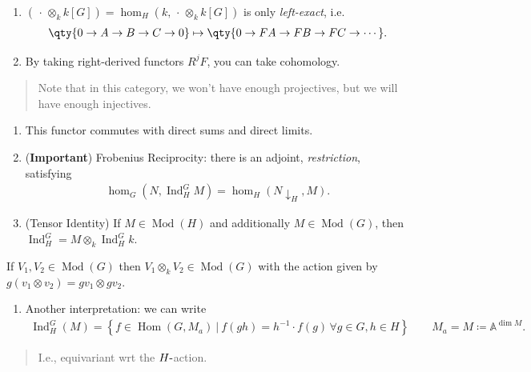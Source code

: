 \begin{enumerate}
\def\labelenumi{\arabic{enumi}.}
\item
  \(({\,\cdot\,}\otimes_k k[G]) = \hom_H(k, {\,\cdot\,}\otimes_k k[G])\)
  is only \emph{left-exact}, i.e.
  \begin{align*}  
  \qty{0\to A\to B\to C\to 0}\mapsto \qty{0\to FA \to FB \to FC \to \cdots}
  .\end{align*}
\item
  By taking right-derived functors \(R^jF\), you can take cohomology.
\end{enumerate}

\begin{quote}
Note that in this category, we won't have enough projectives, but we
will have enough injectives.
\end{quote}

\begin{enumerate}
\def\labelenumi{\arabic{enumi}.}
\setcounter{enumi}{2}
\item
  This functor commutes with direct sums and direct limits.
\item
  (\textbf{Important}) Frobenius Reciprocity: there is an adjoint,
  \emph{restriction}, satisfying
  \begin{align*}  
  \hom_G(N, \operatorname{Ind}_H^G M) = \hom_H(N\downarrow_H, M)
  .\end{align*}
\item
  (Tensor Identity) If \(M\in {\operatorname{Mod}}(H)\) and additionally
  \(M \in {\operatorname{Mod}}(G)\), then
  \(\operatorname{Ind}_H^G = M \otimes_k \operatorname{Ind}_H^G k\).
\end{enumerate}

If \(V_1, V_2 \in {\operatorname{Mod}}(G)\) then
\(V_1 \otimes_k V_2 \in {\operatorname{Mod}}(G)\) with the action given
by \(g(v_1\otimes v_2) = gv_1 \otimes gv_2\).

\begin{enumerate}
\def\labelenumi{\arabic{enumi}.}
\setcounter{enumi}{5}
\tightlist
\item
  Another interpretation: we can write
  \begin{align*}  
  \operatorname{Ind}_H^G(M) = \left\{{f\in {\operatorname{Hom}}(G, M_a)
  {~\mathrel{\Big|}~}
  f(gh) = h^{-1} \cdot f(g)
  \, \forall g\in G, h\in H}\right\} \qquad M_a = M \coloneqq{\mathbb{A}}^{\dim M}
  .\end{align*}
\end{enumerate}

\begin{quote}
I.e., equivariant wrt the \(H{\hbox{-}}\)action.
\end{quote}

